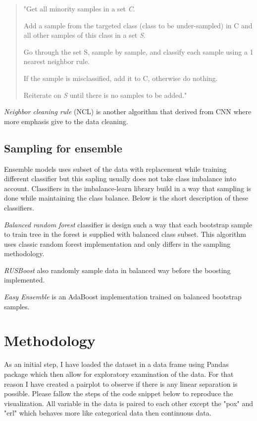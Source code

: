 \documentclass[12pt]{article}
\begin{document}
\begin{quote}
    "Get all minority samples in a set \textit{C}.

    Add a sample from the targeted class (class to be under-sampled) in C and all other samples of this class in a set \textit{S}.


    Go through the set S, sample by sample, and classify each sample using a 1 nearest neighbor rule.

    If the sample is misclassified, add it to C, otherwise do nothing.

    Reiterate on \textit{S} until there is no samples to be added."
\end{quote}

\textit{Neighbor cleaning rule} (NCL) \cite{neighborcleaning} is another algorithm that derived from CNN where more emphasis give to the data cleaning.

\subsection{Sampling for ensemble} \label{subsec:ensemble}

Ensemble models uses subset of the data with replacement while training different classifier but this sapling usually does not take class imbalance into account. Classifiers in the imbalance-learn library build in a way that sampling is done while maintaining the class balance. Below is the short description of these classifiers.

\textit{Balanced random forest} \cite{rforestbalanced} classifier is design such a way that each bootstrap sample to train tree in the forest is supplied with balanced class subset.
This algorithm uses classic random forest \cite{randomforest} implementation and only differs in the sampling methodology.


\textit{RUSBoost} \cite{rusboost} also randomly sample data in balanced way before the boosting implemented.

\textit{Easy Ensemble} \cite{adaboostbalance} is an AdaBoost \cite{adaboost} implementation trained on balanced bootstrap samples.

\section{Methodology} \label{sec:method}
As an initial step, I have loaded the dataset in a data frame using Pandas \cite{pandas} package which then allow for exploratory examination of the data. For that reason I have created a pairplot to observe if there is any linear separation is possible. Please fallow the steps of the code snippet below to reproduce the visualization. All variable in the data is paired to each other except the "pox" and "erl" which behaves more like categorical data then continuous data.
\end{document}
